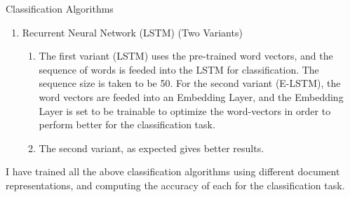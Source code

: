 \documentclass{article}
\begin{document}
\begin{qsection}{Classification Algorithms}
\begin{enumerate}
		\item Recurrent Neural Network (LSTM) (Two Variants)

			\begin{enumerate}
				\item The first variant (LSTM) uses the pre-trained word vectors, and  the
					sequence of words is feeded into the LSTM for  classification.	 The
					sequence size is taken to be 50.  For the second  variant  (E-LSTM),
					the word vectors  are  feeded  into  an  Embedding	Layer,	and  the
					Embedding Layer is set to be trainable to optimize the	word-vectors
					in	order  to  perform	 better   for	the   classification   task.

				\item The   second   variant,   as   expected   gives   better	results.
			\end{enumerate}

	\end{enumerate}

	I have trained all the above classification algorithms using different	document representations, and computing the accuracy of each for the classification task.

\end{qsection}
\end{document}
